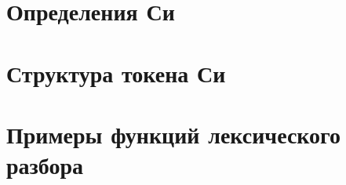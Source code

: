 


% 

% 

% 



\section*{Определения Си}





\section*{Структура токена Си}


\section*{Примеры функций лексического разбора}


